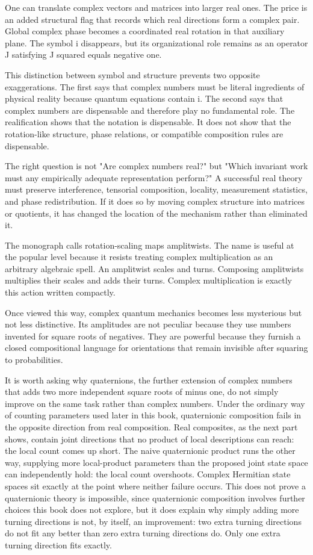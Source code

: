 \documentclass[12pt,openany]{book}
\begin{document}
One can translate complex vectors and matrices into larger real ones. The price is an added structural flag that records which real directions form a complex pair. Global complex phase becomes a coordinated real rotation in that auxiliary plane. The symbol i disappears, but its organizational role remains as an operator J satisfying J squared equals negative one.

This distinction between symbol and structure prevents two opposite exaggerations. The first says that complex numbers must be literal ingredients of physical reality because quantum equations contain i. The second says that complex numbers are dispensable and therefore play no fundamental role. The realification shows that the notation is dispensable. It does not show that the rotation-like structure, phase relations, or compatible composition rules are dispensable.

The right question is not "Are complex numbers real?" but "Which invariant work must any empirically adequate representation perform?" A successful real theory must preserve interference, tensorial composition, locality, measurement statistics, and phase redistribution. If it does so by moving complex structure into matrices or quotients, it has changed the location of the mechanism rather than eliminated it.

The monograph calls rotation-scaling maps amplitwists. The name is useful at the popular level because it resists treating complex multiplication as an arbitrary algebraic spell. An amplitwist scales and turns. Composing amplitwists multiplies their scales and adds their turns. Complex multiplication is exactly this action written compactly.

Once viewed this way, complex quantum mechanics becomes less mysterious but not less distinctive. Its amplitudes are not peculiar because they use numbers invented for square roots of negatives. They are powerful because they furnish a closed compositional language for orientations that remain invisible after squaring to probabilities.

It is worth asking why quaternions, the further extension of complex numbers that adds two more independent square roots of minus one, do not simply improve on the same task rather than complex numbers. Under the ordinary way of counting parameters used later in this book, quaternionic composition fails in the opposite direction from real composition. Real composites, as the next part shows, contain joint directions that no product of local descriptions can reach: the local count comes up short. The naive quaternionic product runs the other way, supplying more local-product parameters than the proposed joint state space can independently hold: the local count overshoots. Complex Hermitian state spaces sit exactly at the point where neither failure occurs. This does not prove a quaternionic theory is impossible, since quaternionic composition involves further choices this book does not explore, but it does explain why simply adding more turning directions is not, by itself, an improvement: two extra turning directions do not fit any better than zero extra turning directions do. Only one extra turning direction fits exactly.
\end{document}
